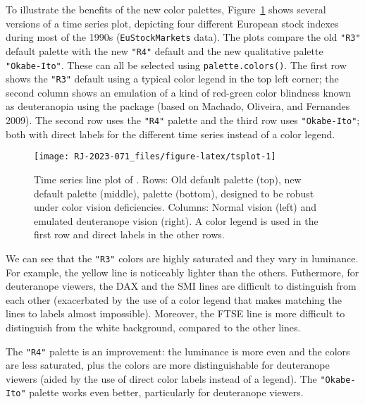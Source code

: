 To illustrate the benefits of the new color palettes,
Figure~\ref{fig:tsplot} shows several versions of a time series plot,
depicting four different European stock indexes during most of the 1990s
(\texttt{EuStockMarkets} data). The plots compare
the old \texttt{"R3"} default palette with
the new \texttt{"R4"} default and the new qualitative palette
\texttt{"Okabe-Ito"}.
These can all be selected using \texttt{palette.colors()}.
The first row shows the \texttt{"R3"} default using a typical color legend in the top left corner;
the second column shows an emulation of a kind of red-green
color blindness known as deuteranopia using the  package
(based on Machado, Oliveira, and Fernandes 2009).
The second row uses the \texttt{"R4"} palette and the third row
uses \texttt{"Okabe-Ito"}; both with direct labels for the different time series instead of
a color legend.

\begin{figure}[h!]

{\centering \texttt{[image: RJ-2023-071\_files/figure-latex/tsplot-1]} 

}

\caption{Time series line plot of . Rows: Old  default palette (top), new  default palette (middle),  palette (bottom), designed to be robust under color vision deficiencies. Columns: Normal vision (left) and emulated deuteranope vision (right). A color legend is used in the first row and direct labels in the other rows.}\label{fig:tsplot}
\end{figure}

We can see that the \texttt{"R3"} colors are highly saturated and they vary in
luminance. For example, the yellow line is noticeably lighter than the others.
Futhermore, for deuteranope viewers, the DAX and the SMI lines are difficult to
distinguish from each other (exacerbated by the use of a color legend that makes
matching the lines to labels almost impossible). Moreover, the FTSE line is more
difficult to distinguish from the white background, compared to the other lines.

The \texttt{"R4"} palette is an improvement: the luminance is more even and
the colors are less saturated, plus the colors are more distinguishable for
deuteranope viewers (aided by the use of direct color labels instead of a legend).
The \texttt{"Okabe-Ito"} palette works even better, particularly for deuteranope viewers.

